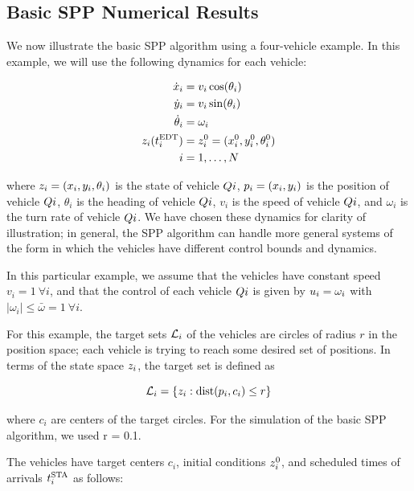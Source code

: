 \subsection{Basic SPP Numerical Results \label{sec:basic_results}}
We now illustrate the basic SPP algorithm using a four-vehicle example. In this example, we will use the following dynamics for each vehicle:

\begin{equation}
\begin{aligned}
\dot x_i &= v_i \cos(\theta_i) \\
\dot y_i &= v_i \sin(\theta_i) \\
\dot \theta_i &= \omega_i \\
z_i(t^\text{EDT}_i) &= z_i^0 = (x_i^0, y_i^0, \theta_i^0) \\
i &= 1, \ldots, N
\end{aligned}
\end{equation}

\noindent where $z_i = (x_i, y_i, \theta_i)$ is the state of vehicle $Q{i}$, $p_i = (x_i, y_i)$ is the position of vehicle $Q{i}$, $\theta_i$ is the heading of vehicle $Q{i}$, $v_i$ is the speed of vehicle $Q{i}$, and $\omega_i$ is the turn rate of vehicle $Q{i}$. We have chosen these dynamics for clarity of illustration; in general, the SPP algorithm can handle more general systems of the form in which the vehicles have different control bounds and dynamics. 

In this particular example, we assume that the vehicles have constant speed $v_i = 1 ~ \forall i$, and that the control of each vehicle $Q{i}$ is given by $u_i = \omega_i$ with $|\omega_i| \le \bar\omega = 1 ~ \forall i$. 

For this example, the target sets $\mathcal{L}_i$ of the vehicles are circles of radius $r$ in the position space; each vehicle is trying to reach some desired set of positions. In terms of the state space $z_i$, the target set is defined as

\begin{equation}
\label{eq:target_sim}
\targetset_i = \{z_i: \dist(p_i, c_i) \le r\}
\end{equation}

\noindent where $c_i$ are centers of the target circles. For the simulation of the basic SPP algorithm, we used r = 0.1.

The vehicles have target centers $c_i$, initial conditions $z_i^0$, and scheduled times of arrivals $t^\text{STA}_i$ as follows:

